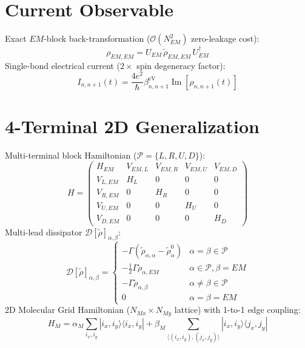 \documentclass[12pt,a4paper]{article}
\begin{document}
\section{Current Observable}
Exact $EM$-block back-transformation ($\mathcal{O}(N_{EM}^2)$ zero-leakage cost):
\begin{equation}
    \rho_{EM, EM} = U_{EM}\, \tilde{\rho}_{EM, EM}\, U_{EM}^\dagger
\end{equation}
Single-bond electrical current ($2\times$ spin degeneracy factor):
\begin{equation}
    I_{n, n+1}(t) = \frac{4 e^2}{\hbar} \beta_{n, n+1}^{\text{eV}} \operatorname{Im}[\rho_{n, n+1}(t)]
\end{equation}

\section{4-Terminal 2D Generalization}
Multi-terminal block Hamiltonian ($\mathcal{P} = \{L, R, U, D\}$):
\begin{equation}
    H = \begin{pmatrix}
        H_{EM} & V_{EM,L} & V_{EM,R} & V_{EM,U} & V_{EM,D} \\
        V_{L,EM} & H_L & 0 & 0 & 0 \\
        V_{R,EM} & 0 & H_R & 0 & 0 \\
        V_{U,EM} & 0 & 0 & H_U & 0 \\
        V_{D,EM} & 0 & 0 & 0 & H_D
    \end{pmatrix}
\end{equation}
Multi-lead dissipator $\mathcal{D}[\tilde{\rho}]_{\alpha,\beta}$:
\begin{equation}
    \mathcal{D}[\tilde{\rho}]_{\alpha,\beta} = \begin{cases}
        -\Gamma (\tilde{\rho}_{\alpha,\alpha} - \tilde{\rho}^0_\alpha) & \alpha = \beta \in \mathcal{P} \\
        -\frac{1}{2}\Gamma \tilde{\rho}_{\alpha,EM} & \alpha \in \mathcal{P}, \beta = EM \\
        -\Gamma \tilde{\rho}_{\alpha,\beta} & \alpha \neq \beta \in \mathcal{P} \\
        0 & \alpha = \beta = EM
    \end{cases}
\end{equation}
2D Molecular Grid Hamiltonian ($N_{Mx} \times N_{My}$ lattice) with 1-to-1 edge coupling:
\begin{equation}
    H_{M} = \alpha_M \sum_{i_x, i_y} |i_x, i_y\rangle\langle i_x, i_y| + \beta_M \sum_{\langle (i_x,i_y), (j_x,j_y) \rangle} |i_x, i_y\rangle\langle j_x, j_y|
\end{equation}
\end{document}
